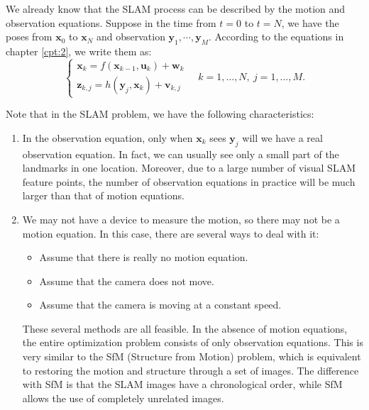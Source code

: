 We already know that the SLAM process can be described by the motion and observation equations. Suppose in the time from $t=0$ to $t=N$, we have the poses from $\mathbf{x}_0$ to $\mathbf{x}_N$ and observation $\mathbf{y}_1, \cdots, \mathbf{y}_M$. According to the equations in chapter \ref{cpt:2}, we write them as: 
\begin{equation}
	\left\{ \begin{array}{l}
		{\mathbf{x}_k} = f\left( {{\mathbf{x}_{k - 1}},{\mathbf{u}_k}} \right) + \mathbf{w}_k \\
		{\mathbf{z}_{k,j}} = h\left( {{ \mathbf{y}_j},{ \mathbf{x}_k}}  \right)+ \mathbf{v}_{k,j}
	\end{array} \right. \quad k=1, \ldots, N, \  j=1, \ldots, M.
\end{equation}

Note that in the SLAM problem, we have the following characteristics:
\begin{enumerate}
	\item In the observation equation, only when $\mathbf{x}_k$ sees $\mathbf{y}_j$ will we have a real observation equation. In fact, we can usually see only a small part of the landmarks in one location. Moreover, due to a large number of visual SLAM feature points, the number of observation equations in practice will be much larger than that of motion equations.
	\item We may not have a device to measure the motion, so there may not be a motion equation. In this case, there are several ways to deal with it:
	\begin{itemize}
		\item Assume that there is really no motion equation.
		\item Assume that the camera does not move.
		\item Assume that the camera is moving at a constant speed.
	\end{itemize}
	These several methods are all feasible. In the absence of motion equations, the entire optimization problem consists of only observation equations. This is very similar to the SfM (Structure from Motion) problem, which is equivalent to restoring the motion and structure through a set of images. The difference with SfM is that the SLAM images have a chronological order, while SfM allows the use of completely unrelated images.
\end{enumerate} 


